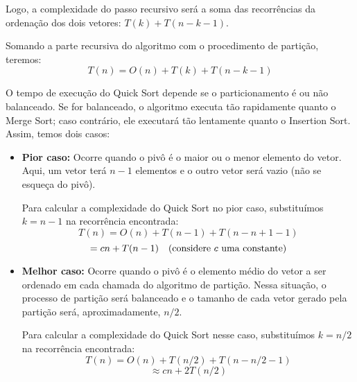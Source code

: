 Logo, a complexidade do passo recursivo será a soma das recorrências da ordenação dos dois vetores: \( T(k) + T(n - k - 1) \).

Somando a parte recursiva do algoritmo com o procedimento de partição, teremos:
\[
T(n) = O(n) + T(k) + T(n - k - 1)
\]

O tempo de execução do Quick Sort depende se o particionamento é ou não balanceado. Se for balanceado, o algoritmo executa tão rapidamente quanto o Merge Sort; caso contrário, ele executará tão lentamente quanto o Insertion Sort. Assim, temos dois casos:

    \begin{itemize}
        \item \textbf{Pior caso:} Ocorre quando o pivô é o maior ou o menor elemento do vetor. Aqui, um vetor terá \( n-1 \) elementos e o outro vetor será vazio (não se esqueça do pivô).
    
    Para calcular a complexidade do Quick Sort no pior caso, substituímos \( k = n - 1 \) na recorrência encontrada:
    \[
    T(n) = O(n) + T(n-1) + T(n - n + 1 - 1)
    \]
    \[
    = cn + T(n-1) \quad \text{(considere \( c \) uma constante)}
    \]

\item \textbf{Melhor caso:} Ocorre quando o pivô é o elemento médio do vetor a ser ordenado em cada chamada do algoritmo de partição. Nessa situação, o processo de partição será balanceado e o tamanho de cada vetor gerado pela partição será, aproximadamente, \( n/2 \).
    
    Para calcular a complexidade do Quick Sort nesse caso, substituímos \( k = n/2 \) na recorrência encontrada:
    \[
    T(n) = O(n) + T(n/2) + T(n - n/2 - 1)
    \]
    \[
    \approx cn + 2T(n/2)
    \]

    \end{itemize}




